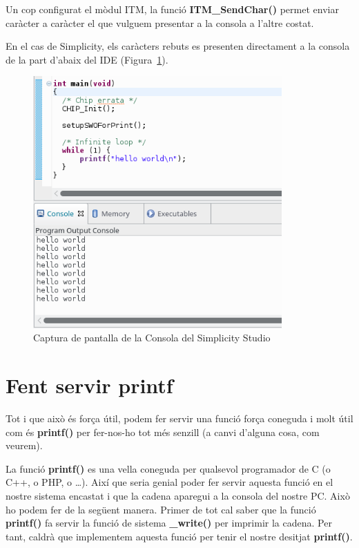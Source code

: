 Un cop configurat el mòdul ITM, la funció {\bf ITM\_SendChar()} permet enviar caràcter a caràcter el que vulguem presentar a la consola a l'altre costat.

En el cas de Simplicity, els caràcters rebuts es presenten directament a la consola de la part d'abaix del \gls{IDE} (Figura~\ref{fig:ITM}).

\begin{figure}
 \centering
 \includegraphics[width=0.85\textwidth, keepaspectratio]{imatges/ITM_Debug.png}
 \caption{Captura de pantalla de la Consola del Simplicity Studio}
 \label{fig:ITM}
\end{figure}

\chapter{Fent servir printf}
\label{sub:console_example}
Tot i que això és força útil, podem fer servir una funció força coneguda i molt útil com és {\bf printf()} per fer-nos-ho tot més senzill (a canvi d'alguna cosa, com veurem).

La funció {\bf printf()} es una vella coneguda per qualsevol programador de C (o C++, o PHP, o …). Així que seria genial poder fer servir aquesta funció en el nostre sistema encastat i que la cadena aparegui a la consola del nostre PC. Això ho podem fer de la següent manera. Primer de tot cal saber que la funció {\bf printf()} fa servir la funció de sistema {\bf \_write()} per imprimir la cadena. Per tant, caldrà que implementem aquesta funció per tenir el nostre desitjat {\bf printf()}.

